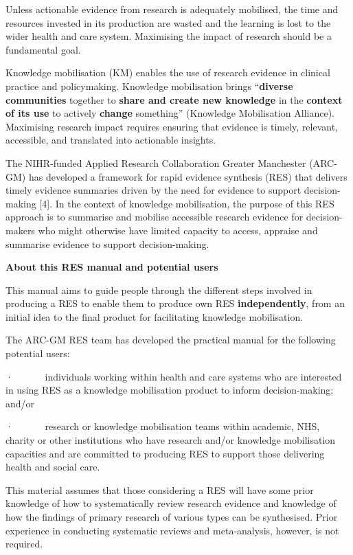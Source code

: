 \documentclass[
  letterpaper,
  DIV=11,
  numbers=noendperiod]{scrreprt}
\begin{document}
Unless actionable evidence from research is adequately mobilised, the
time and resources invested in its production are wasted and the
learning is lost to the wider health and care system. Maximising the
impact of research should be a fundamental goal.

Knowledge mobilisation (KM) enables the use of research evidence in
clinical practice and policymaking. Knowledge mobilisation brings
``\textbf{diverse communities} together to \textbf{share and create new
knowledge} in the \textbf{context of its use} to actively
\textbf{change} something'' (Knowledge Mobilisation Alliance).
Maximising research impact requires ensuring that evidence is timely,
relevant, accessible, and translated into actionable insights.

The NIHR-funded Applied Research Collaboration Greater Manchester
(ARC-GM) has developed a framework for rapid evidence synthesis (RES)
that delivers timely evidence summaries driven by the need for evidence
to support decision-making {[}4{]}. In the context of knowledge
mobilisation, the purpose of this RES approach is to summarise and
mobilise accessible research evidence for decision-makers who might
otherwise have limited capacity to access, appraise and summarise
evidence to support decision-making.

\textbf{About this RES manual and potential users}

This manual aims to guide people through the different steps involved in
producing a RES to enable them to produce own RES
\textbf{independently}, from an initial idea to the final product for
facilitating knowledge mobilisation.

The ARC-GM RES team has developed the practical manual for the following
potential users:

·~~~~~~ individuals working within health and care systems who are
interested in using RES as a knowledge mobilisation product to inform
decision-making; and/or

·~~~~~~ research or knowledge mobilisation teams within academic, NHS,
charity or other institutions who have research and/or knowledge
mobilisation capacities and are committed to producing RES to support
those delivering health and social care.

This material assumes that those considering a RES will have some prior
knowledge of how to systematically review research evidence and
knowledge of how the findings of primary research of various types can
be synthesised. Prior experience in conducting systematic reviews and
meta-analysis, however, is not required.
\end{document}
